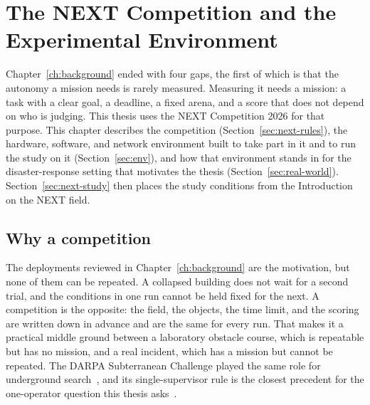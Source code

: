 
\chapter{The NEXT Competition and the Experimental Environment}
\label{ch:competition}

Chapter~\ref{ch:background} ended with four gaps, the first of which is that the autonomy a mission needs is rarely measured.
Measuring it needs a mission: a task with a clear goal, a deadline, a fixed arena, and a score that does not depend on who is judging.
This thesis uses the NEXT Competition 2026 for that purpose.
This chapter describes the competition (Section~\ref{sec:next-rules}), the hardware, software, and network environment built to take part in it and to run the study on it (Section~\ref{sec:env}), and how that environment stands in for the disaster-response setting that motivates the thesis (Section~\ref{sec:real-world}).
Section~\ref{sec:next-study} then places the study conditions from the Introduction on the NEXT field.

\section{Why a competition}
\label{sec:why-competition}

The deployments reviewed in Chapter~\ref{ch:background} are the motivation, but none of them can be repeated.
A collapsed building does not wait for a second trial, and the conditions in one run cannot be held fixed for the next.
A competition is the opposite: the field, the objects, the time limit, and the scoring are written down in advance and are the same for every run.
That makes it a practical middle ground between a laboratory obstacle course, which is repeatable but has no mission, and a real incident, which has a mission but cannot be repeated.
The DARPA Subterranean Challenge played the same role for underground search~\citep{darpa2021subt}, and its single-supervisor rule is the closest precedent for the one-operator question this thesis asks~\citep{ackerman2021subtoperators}.

